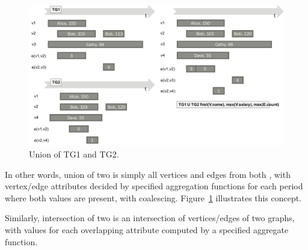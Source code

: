 \begin{figure}
\includegraphics[width=6.5in]{figs/union.pdf}
\caption{Union of TG1 and TG2.}
\label{fig:union}
\end{figure}

In other words, union of two \tgs is simply all vertices and edges
from both \tgs, with vertex/edge attributes decided by specified
aggregation functions for each period where both values are present,
with coalescing.  Figure~\ref{fig:union} illustrates this concept.

Similarly, intersection of two \tgs is an intersection of
vertices/edges of two graphs, with values for each overlapping
attribute computed by a specified aggregate function.
